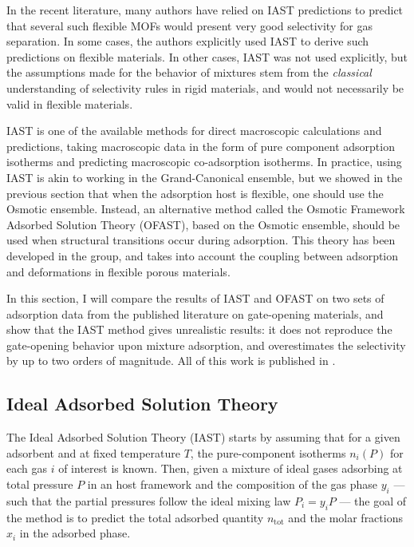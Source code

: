 \documentclass[thesis]{subfiles}
\begin{document}
In the recent literature, many authors have relied on IAST predictions to
predict that several such flexible MOFs would present very good selectivity for
gas separation. In some cases, the authors explicitly used IAST to derive such
predictions on flexible materials\cite{Banerjee2014, Mukherjee2015, Foo2016,
Li2016}. In other cases, IAST was not used explicitly, but the assumptions made
for the behavior of mixtures stem from the \emph{classical} understanding of
selectivity rules in rigid materials, and would not necessarily be valid in
flexible materials\cite{Gucuyener2010, Inubushi2010, Nijem2012, Sanda2013,
Joarder2014, Mukherjee2014}.

IAST is one of the available methods for direct macroscopic calculations and
predictions, taking macroscopic data in the form of pure component adsorption
isotherms and predicting macroscopic co-adsorption isotherms. In practice, using
IAST is akin to working in the Grand-Canonical ensemble, but we showed in the
previous section that when the adsorption host is flexible, one should use the
Osmotic ensemble. Instead, an alternative method called the Osmotic Framework
Adsorbed Solution Theory (OFAST)\cite{Coudert2009}, based on the Osmotic
ensemble, should be used when structural transitions occur during adsorption.
This theory has been developed in the group\cite{Coudert2010,Ortiz2011}, and
takes into account the coupling between adsorption and deformations in flexible
porous materials.


In this section, I will compare the results of IAST and OFAST on two sets of
adsorption data from the published literature on gate-opening materials, and
show that the IAST method gives unrealistic results: it does not reproduce the
gate-opening behavior upon mixture adsorption, and overestimates the selectivity
by up to two orders of magnitude. All of this work is published in
\cite{Fraux2018}.

\subsection{Ideal Adsorbed Solution Theory}

The Ideal Adsorbed Solution Theory (IAST) starts by assuming that for a given
adsorbent and at fixed temperature $T$, the pure-component isotherms $n_i(P)$
for each gas $i$ of interest is known. Then, given a mixture of ideal gases
adsorbing at total pressure $P$ in an host framework and the composition of the
gas phase $y_i$ --- such that the partial pressures follow the ideal mixing law
$P_i = y_i P$ --- the goal of the method is to predict the total adsorbed
quantity $n_\text{tot}$ and the molar fractions $x_i$ in the adsorbed phase.
\end{document}
